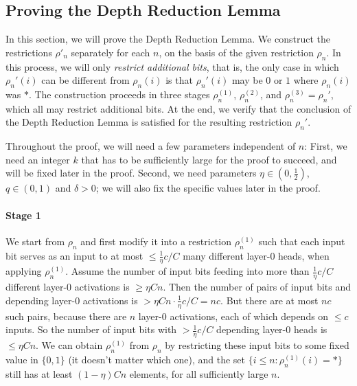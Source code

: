 \documentclass[11pt,a4paper]{article}
\begin{document}


\subsection{Proving the Depth Reduction Lemma}
In this section, we will prove the Depth Reduction Lemma.
We construct the restrictions $\rho'_n$ separately for each $n$, on the basis of the given restriction $\rho_n$.
In this process, we will only \emph{restrict additional bits}, that is, the only case in which $\rho_n'(i)$ can be different from $\rho_n(i)$ is that $\rho_n'(i)$ may be $0$ or $1$ where $\rho_n(i)$ was $*$.
The construction proceeds in three stages $\rho_n^{(1)}$, $\rho_n^{(2)}$, and $\rho_n^{(3)} = \rho_n'$, which all may restrict additional bits.
At the end, we verify that the conclusion of the Depth Reduction Lemma is satisfied for the resulting restriction $\rho_n'$.

Throughout the proof, we will need a few parameters independent of $n$: First, we need an integer $k$ that has to be sufficiently large for the proof to succeed, and will be fixed later in the proof.
Second, we need parameters $\eta \in (0, \frac{1}{2})$, $q \in (0,1)$ and $\delta > 0$; we will also fix the specific values later in the proof.



\paragraph{Stage 1}
We start from $\rho_n$ and first modify it into a restriction $\rho^{(1)}_n$ such that each input bit serves as an input to at most $\leq \frac{1}{\eta} c/C$ many different layer-0 heads, when applying $\rho^{(1)}_n$.
Assume the number of input bits feeding into more than $\frac{1}{\eta} c/C$ different layer-0 activations is $\geq \eta Cn$.
Then the number of pairs of input bits and depending layer-0 activations is $>\eta Cn \cdot \frac{1}{\eta} c/C = nc$.
But there are at most $nc$ such pairs, because there are $n$ layer-0 activations, each of which depends on $\leq c$ inputs.
So the number of input bits with $> \frac{1}{\eta} c/C$ depending layer-0 heads is $\leq \eta Cn$.
We can obtain $\rho^{(1)}_n$ from $\rho_n$ by restricting these input bits to some fixed value in $\{0, 1\}$ (it doesn't matter which one), and the set $\{i \leq n: \rho^{(1)}_n(i) = *\}$ still has at least $(1-\eta) C n$ elements, for all sufficiently large $n$.
\end{document}
